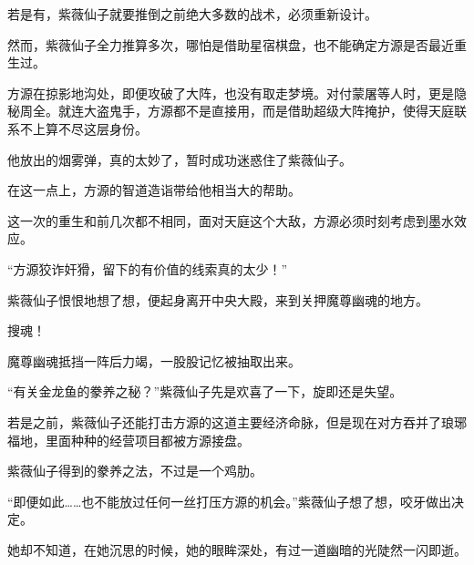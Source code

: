 \begin{this_body}
若是有，紫薇仙子就要推倒之前绝大多数的战术，必须重新设计。

然而，紫薇仙子全力推算多次，哪怕是借助星宿棋盘，也不能确定方源是否最近重生过。

方源在掠影地沟处，即便攻破了大阵，也没有取走梦境。对付蒙屠等人时，更是隐秘周全。就连大盗鬼手，方源都不是直接用，而是借助超级大阵掩护，使得天庭联系不上算不尽这层身份。

他放出的烟雾弹，真的太妙了，暂时成功迷惑住了紫薇仙子。

在这一点上，方源的智道造诣带给他相当大的帮助。

这一次的重生和前几次都不相同，面对天庭这个大敌，方源必须时刻考虑到墨水效应。

“方源狡诈奸猾，留下的有价值的线索真的太少！”

紫薇仙子恨恨地想了想，便起身离开中央大殿，来到关押魔尊幽魂的地方。

搜魂！

魔尊幽魂抵挡一阵后力竭，一股股记忆被抽取出来。

“有关金龙鱼的豢养之秘？”紫薇仙子先是欢喜了一下，旋即还是失望。

若是之前，紫薇仙子还能打击方源的这道主要经济命脉，但是现在对方吞并了琅琊福地，里面种种的经营项目都被方源接盘。

紫薇仙子得到的豢养之法，不过是一个鸡肋。

“即便如此……也不能放过任何一丝打压方源的机会。”紫薇仙子想了想，咬牙做出决定。

她却不知道，在她沉思的时候，她的眼眸深处，有过一道幽暗的光陡然一闪即逝。

\end{this_body}

